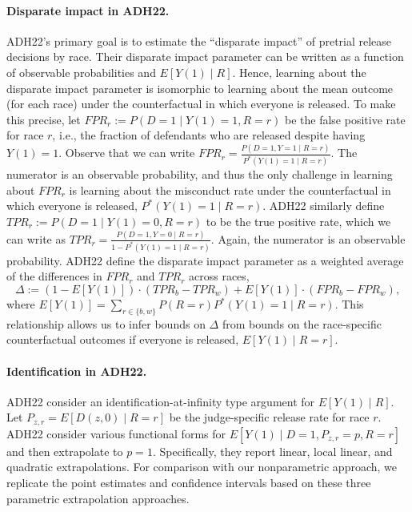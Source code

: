 \documentclass[12pt]{article}%
\theoremstyle{definition}
\newcommand\1{\operatorname{I}\indicatorfence}
\begin{document}
\paragraph{Disparate impact in ADH22.} ADH22's primary goal is to estimate the
``disparate impact'' of pretrial release decisions by race. Their disparate
impact parameter can be written as a function of observable probabilities and
$E[Y(1) \mid R]$. Hence, learning about the disparate impact parameter is
isomorphic to learning about the mean outcome (for each race) under the
counterfactual in which everyone is released. To make this precise, let
$FPR_r := P(D=1 \mid Y(1) =1, R=r)$ be the false positive rate for race $r$,
i.e., the fraction of defendants who are released despite having $Y(1)=1$.
Observe that we can write
$FPR_r = \frac{P(D=1, Y=1 \mid R=r)}{P^*(Y(1) =1 \mid R=r)}$. The numerator is
an observable probability, and thus the only challenge in learning about
$FPR_{r}$ is learning about the misconduct rate under the counterfactual in
which everyone is released, $P^*(Y(1) =1 \mid R=r)$. ADH22 similarly define
$TPR_r := P(D=1 \mid Y(1) =0, R=r)$ to be the true positive rate, which we can
write as $TPR_r = \frac{P(D=1, Y=0 \mid R=r)}{1-P^*(Y(1) =1 \mid R=r)}$. Again,
the numerator is an observable probability. ADH22 define the disparate impact
parameter as a weighted average of the differences in $FPR_r$ and $TPR_r$ across
races,
\begin{equation*}
    \Delta := (1-E[Y(1)]) \cdot (TPR_{b}-TPR_{w}) + E[Y(1)] \cdot (FPR_{b}-FPR_w),
\end{equation*}
where $E[Y(1)]=\sum_{r\in\{b, w\}}P(R=r)P^{*}(Y(1)=1\mid R=r)$. This
relationship allows us to infer bounds on $\Delta$ from bounds on the
race-specific counterfactual outcomes if everyone is released,
$E[Y(1) \mid R=r]$.


\paragraph{Identification in ADH22.} ADH22 consider an
identification-at-infinity type argument for $E[Y(1) \mid R]$. Let
$P_{z, r} = E[D(z,0) \mid R=r]$ be the judge-specific release rate for race $r$. ADH22 consider various
functional forms for $E[Y(1) \mid D=1,P_{z, r}=p, R=r]$ and then extrapolate to $p=1$.
Specifically, they report linear, local linear, and quadratic extrapolations.
For comparison with our nonparametric approach, we replicate the point estimates
and confidence intervals based on these three parametric extrapolation
approaches.
\end{document}

